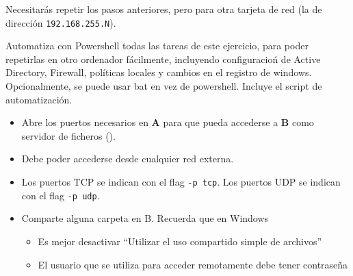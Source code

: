 \begin{homeworkProblem}
  Necesitarás repetir los pasos anteriores, pero para otra tarjeta de red (la de dirección \texttt{192.168.255.N}).
\end{homeworkProblem}


\begin{homeworkProblem}

            {\vspace{-1cm}\noindent\fontsize{.1}{.1}\selectfont Automatiza con Powershell todas las tareas de este ejercicio, para poder repetirlas en otro ordenador fácilmente, incluyendo configuracioń de Active Directory, Firewall, políticas locales y cambios en el registro de windows. Opcionalmente, se puede usar bat en vez de powershell. Incluye el script de automatización. \vspace{-.5cm}}

  \begin{itemize}
  \item Abre los puertos necesarios en \textbf{A} para que pueda accederse a \textbf{B} como servidor de ficheros ().
  \item Debe poder accederse desde cualquier red externa.
  \item  Los puertos TCP se indican con el flag \texttt{-p tcp}. Los puertos UDP se indican con el flag \texttt{-p udp}.
    
  \item Comparte alguna carpeta en B. Recuerda que en Windows
    \begin{itemize}
    \item Es mejor desactivar “Utilizar el uso compartido simple de archivos”
    \item El usuario que se utiliza para acceder remotamente debe tener contraseña
    \end{itemize}

  \end{itemize}

  

\end{homeworkProblem}
